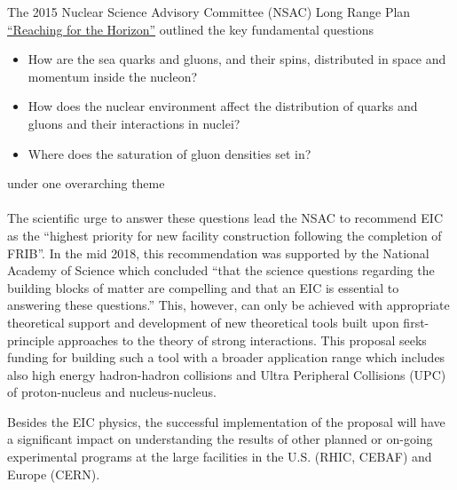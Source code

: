 
The 2015 Nuclear Science Advisory Committee (NSAC) Long Range Plan
\href{https://science.energy.gov/np/nsac/}
{``Reaching  for the Horizon''} outlined the key fundamental  questions{\it 
\begin{itemize}
	\item [] How are the sea quarks and gluons, and their spins, distributed in
		space and momentum inside the nucleon? 
	\item [ ] How does the nuclear environment affect the distribution of
		quarks and gluons and their interactions in nuclei?
	\item [] Where does the saturation of gluon densities set in?
\end{itemize}}
\noindent 
under one overarching theme \\
 \\ \noindent 
The scientific  urge to answer these questions lead the NSAC 
to recommend EIC as the ``highest priority for new facility construction
following the completion of FRIB''. In the mid 2018, this recommendation 
was supported by the National Academy of Science which  concluded 
``that the science questions
regarding the building blocks of matter are compelling and that an EIC is
essential to answering these questions.'' 
This, however, can only be achieved   
with appropriate theoretical support %
and development of new theoretical tools built upon 
first-principle approaches  to 
the theory of strong interactions. 
This proposal seeks funding for building such a tool 
with a broader application range which includes also high energy hadron-hadron 
collisions and Ultra Peripheral Collisions (UPC) of proton-nucleus and nucleus-nucleus.   

Besides the EIC physics, 
the successful implementation of the proposal will have a significant impact on 
understanding the results of other planned or on-going experimental programs  at the large 
facilities in the U.S. (RHIC, CEBAF) and Europe (CERN). 



